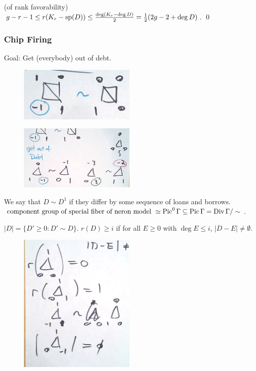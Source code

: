 \pf (of rank favorability) $g - r - 1 \leq r(K_r - \sp(D)) \leq \frac{\deg(K_r - \deg D)}{2}= \frac{1}{2} (2g - 2 + \deg D)$. \qed \\



\subsubsection{Chip Firing}

Goal: Get (everybody) out of debt. 


	\begin{figure}[!ht]
	\centering
	\includegraphics[width=0.5\textwidth]{../images/im24.png}
	\end{figure}
	
	\begin{figure}[!ht]
	\centering
	\includegraphics[width=0.5\textwidth]{../images/im25.png}
	\end{figure}


We say that $D \sim D^1$ if they differ by some sequence of loans and borrows. $\text{component group of special fiber of neron model } \simeq \pic^0 \Gamma \subseteq \pic \Gamma= \div \Gamma/\sim$.


$|D|= \{ D' \geq 0 \colon D' \sim D \}$. $r(D) \geq i$ if for all $E \geq 0$ with $\deg E \leq i$, $|D - E|\neq \emptyset$. 


	\begin{figure}[!ht]
	\centering
	\includegraphics[width=0.5\textwidth]{../images/im26.png}
	\end{figure}


